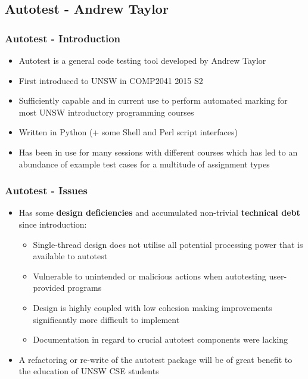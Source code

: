 \documentclass[xcolor, handout]{beamer}
\begin{document}
\subsection{Autotest - Andrew Taylor}
\begin{frame}
	\frametitle{Autotest - Introduction}
	\begin{itemize}
		\setlength\itemsep{1em}
		\item Autotest is a general code testing tool developed by Andrew Taylor
			\pause
		\item First introduced to UNSW in COMP2041 2015 S2
			\pause
		\item Sufficiently capable and in current use to perform automated marking for most UNSW introductory programming courses
			\pause
		\item Written in Python (+ some Shell and Perl script interfaces)
			\pause
		\item Has been in use for many sessions with different courses which has led to an abundance of example test cases for a multitude of assignment types
	\end{itemize}
\end{frame}
\begin{frame}
	\frametitle{Autotest - Issues}
	\begin{itemize}
		\setlength\itemsep{1em}
		\item Has some \textbf{design deficiencies} and accumulated non-trivial \textbf{technical debt} since introduction:
		\begin{itemize}
			\setlength\itemsep{0.5em}
			\item Single-thread design does not utilise all potential processing power that is available to autotest
			\pause
			\item Vulnerable to unintended or malicious actions when autotesting user-provided programs
			\pause
			\item Design is highly coupled with low cohesion making improvements significantly more difficult to implement
			\pause
			\item Documentation in regard to crucial autotest components were lacking
			\pause
		\end{itemize}
		\item A refactoring or re-write of the autotest package will be of great benefit to the education of UNSW CSE students
	\end{itemize}
\end{frame}
\end{document}
